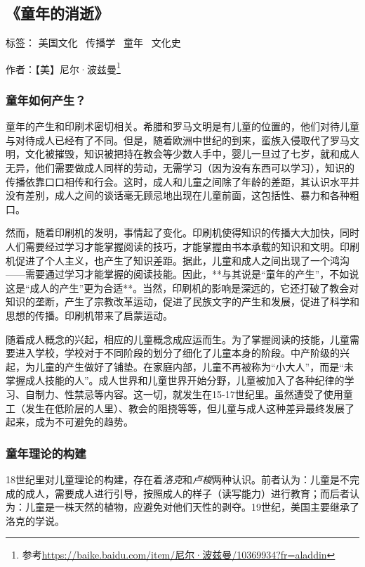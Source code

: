 \subsection{《童年的消逝》}

标签： 美国文化 \  传播学 \  童年 \  文化史

作者：【美】尼尔·波兹曼\footnote{参考\url{https://baike.baidu.com/item/尼尔·波兹曼/10369934?fr=aladdin}}

\subsubsection{童年如何产生？}
童年的产生和印刷术密切相关。希腊和罗马文明是有儿童的位置的，他们对待儿童与对待成人已经有了不同。但是，随着欧洲中世纪的到来，蛮族入侵取代了罗马文明，文化被摧毁，知识被把持在教会等少数人手中，婴儿一旦过了七岁，就和成人无异，他们需要做成人同样的劳动，无需学习（因为没有东西可以学习），知识的传播依靠口口相传和行会。这时，成人和儿童之间除了年龄的差距，其认识水平并没有差别，成人之间的谈话毫无顾忌地出现在儿童前面，这包括性、暴力和各种粗口。

然而，随着印刷机的发明，事情起了变化。印刷机使得知识的传播大大加快，同时人们需要经过学习才能掌握阅读的技巧，才能掌握由书本承载的知识和文明。印刷机促进了个人主义，也产生了知识差距。据此，儿童和成人之间出现了一个鸿沟——需要通过学习才能掌握的阅读技能。因此，**与其说是“童年的产生”，不如说这是“成人的产生”更为合适**。当然，印刷机的影响是深远的，它还打破了教会对知识的垄断，产生了宗教改革运动，促进了民族文字的产生和发展，促进了科学和思想的传播。印刷机带来了启蒙运动。

随着成人概念的兴起，相应的儿童概念成应运而生。为了掌握阅读的技能，儿童需要进入学校，学校对于不同阶段的划分了细化了儿童本身的阶段。中产阶级的兴起，为儿童的产生做好了铺垫。在家庭内部，儿童不再被称为“小大人”，而是“未掌握成人技能的人”。成人世界和儿童世界开始分野，儿童被加入了各种纪律的学习、自制力、性禁忌等内容。这一切，就发生在15-17世纪里。虽然遭受了使用童工（发生在低阶层的人里）、教会的阻挠等等，但儿童与成人这种差异最终发展了起来，成为不可避免的趋势。

\subsubsection{童年理论的构建}
18世纪里对儿童理论的构建，存在着\emph{洛克}和\emph{卢梭}两种认识。前者认为：儿童是不完成的成人，需要成人进行引导，按照成人的样子（读写能力）进行教育；而后者认为：儿童是一株天然的植物，应避免对他们天性的剥夺。19世纪，美国主要继承了洛克的学说。

